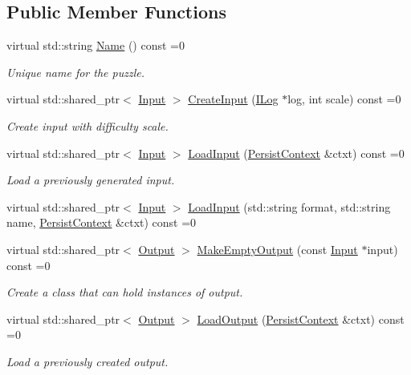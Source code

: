 \subsection*{Public Member Functions}
\begin{DoxyCompactItemize}
\item 
virtual std\+::string \hyperlink{a00026_a38d988a8485d3a3e4699c1f609772373}{Name} () const =0
\begin{DoxyCompactList}\small\item\em Unique name for the puzzle. \end{DoxyCompactList}\item 
virtual std\+::shared\+\_\+ptr$<$ \hyperlink{a00009}{Input} $>$ \hyperlink{a00026_a1b68731801d378875d8e8a0068d35562}{Create\+Input} (\hyperlink{a00008}{I\+Log} $\ast$log, int scale) const =0
\begin{DoxyCompactList}\small\item\em Create input with difficulty scale. \end{DoxyCompactList}\item 
virtual std\+::shared\+\_\+ptr$<$ \hyperlink{a00009}{Input} $>$ \hyperlink{a00026_af149fa9c4de77128b9ab1cd8b345a88b}{Load\+Input} (\hyperlink{a00025}{Persist\+Context} \&ctxt) const =0
\begin{DoxyCompactList}\small\item\em Load a previously generated input. \end{DoxyCompactList}\item 
virtual std\+::shared\+\_\+ptr$<$ \hyperlink{a00009}{Input} $>$ \hyperlink{a00026_a4a9d6b572bf0544907eb8ff8ad83ffbd}{Load\+Input} (std\+::string format, std\+::string name, \hyperlink{a00025}{Persist\+Context} \&ctxt) const =0
\item 
virtual std\+::shared\+\_\+ptr$<$ \hyperlink{a00023}{Output} $>$ \hyperlink{a00026_a9765b5110fd1919a1c174187a51e674a}{Make\+Empty\+Output} (const \hyperlink{a00009}{Input} $\ast$input) const =0
\begin{DoxyCompactList}\small\item\em Create a class that can hold instances of output. \end{DoxyCompactList}\item 
virtual std\+::shared\+\_\+ptr$<$ \hyperlink{a00023}{Output} $>$ \hyperlink{a00026_a556927fbbbfebb310e41b5d7e5a128f3}{Load\+Output} (\hyperlink{a00025}{Persist\+Context} \&ctxt) const =0
\begin{DoxyCompactList}\small\item\em Load a previously created output. \end{DoxyCompactList}\item 

\end{DoxyCompactItemize}
